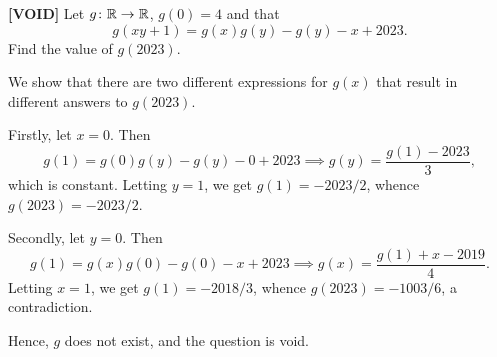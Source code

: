 \begin{question}\label{Q::2023-O-1-20}
    \textbf{[VOID]} Let $g \colon \mathbb{R} \to \mathbb{R}$, $g(0) = 4$ and that \[g(xy + 1) = g(x)g(y) - g(y) - x + 2023.\] Find the value of $g(2023)$.
\end{question}
\begin{solution*}
    We show that there are two different expressions for $g(x)$ that result in different answers to $g(2023)$.

    Firstly, let $x = 0$. Then \[g(1) = g(0)g(y) - g(y) - 0 + 2023 \implies g(y) = \frac{g(1) - 2023}{3},\] which is constant. Letting $y = 1$, we get $g(1) = -2023/2$, whence $g(2023) = -2023/2$.

    Secondly, let $y = 0$. Then \[g(1) = g(x)g(0) - g(0) - x + 2023 \implies g(x) = \frac{g(1) + x - 2019}{4}.\] Letting $x = 1$, we get $g(1) = -2018/3$, whence $g(2023) = -1003/6$, a contradiction.

    Hence, $g$ does not exist, and the question is void.
\end{solution*}

